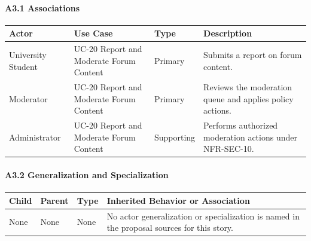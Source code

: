\documentclass[12pt]{article}
\renewcommand{\baselinestretch}{1.5}
\begin{document}
\hypertarget{sec:a3-1-associations}{}
\paragraph*{A3.1 Associations}
\par\medskip

\begingroup
\small
\renewcommand{\baselinestretch}{1.0}\selectfont
\renewcommand{\arraystretch}{1.15}
\setlength{\tabcolsep}{6pt}
\begin{longtable}{|>{\raggedright\arraybackslash}p{}|>{\raggedright\arraybackslash}p{}|>{\raggedright\arraybackslash}p{}|>{\raggedright\arraybackslash}p{}|}
\hline
\textbf{Actor} & \textbf{Use Case} & \textbf{Type} & \textbf{Description} \\ \hline
\endhead
University Student & UC-20 Report and Moderate Forum Content & Primary & Submits a report on forum content. \\ \hline
Moderator & UC-20 Report and Moderate Forum Content & Primary & Reviews the moderation queue and applies policy actions. \\ \hline
Administrator & UC-20 Report and Moderate Forum Content & Supporting & Performs authorized moderation actions under NFR-SEC-10. \\ \hline
\end{longtable}
\endgroup
\par\medskip

\hypertarget{sec:a3-2-generalization-and-specialization}{}
\paragraph*{A3.2 Generalization and Specialization}
\par\medskip

\begingroup
\small
\renewcommand{\baselinestretch}{1.0}\selectfont
\renewcommand{\arraystretch}{1.15}
\setlength{\tabcolsep}{6pt}
\begin{longtable}{|>{\raggedright\arraybackslash}p{}|>{\raggedright\arraybackslash}p{}|>{\raggedright\arraybackslash}p{}|>{\raggedright\arraybackslash}p{}|}
\hline
\textbf{Child} & \textbf{Parent} & \textbf{Type} & \textbf{Inherited Behavior or Association} \\ \hline
\endhead
None & None & None & No actor generalization or specialization is named in the proposal sources for this story. \\ \hline
\end{longtable}
\endgroup
\par\medskip
\end{document}
